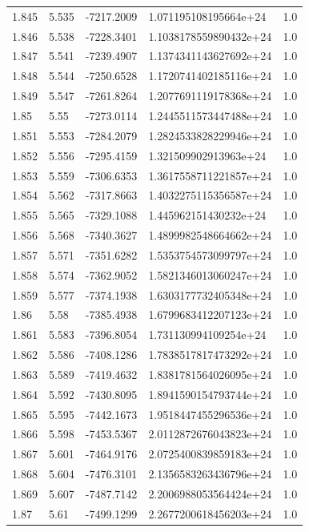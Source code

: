 \begin{tabular}{lllll}
1.845 & 5.535 & -7217.2009 & 1.071195108195664e+24 & 1.0 \\
1.846 & 5.538 & -7228.3401 & 1.1038178559890432e+24 & 1.0 \\
1.847 & 5.541 & -7239.4907 & 1.1374341143627692e+24 & 1.0 \\
1.848 & 5.544 & -7250.6528 & 1.1720741402185116e+24 & 1.0 \\
1.849 & 5.547 & -7261.8264 & 1.2077691119178368e+24 & 1.0 \\
1.85 & 5.55 & -7273.0114 & 1.2445511573447488e+24 & 1.0 \\
1.851 & 5.553 & -7284.2079 & 1.2824533828229946e+24 & 1.0 \\
1.852 & 5.556 & -7295.4159 & 1.321509902913963e+24 & 1.0 \\
1.853 & 5.559 & -7306.6353 & 1.3617558711221857e+24 & 1.0 \\
1.854 & 5.562 & -7317.8663 & 1.4032275115356587e+24 & 1.0 \\
1.855 & 5.565 & -7329.1088 & 1.445962151430232e+24 & 1.0 \\
1.856 & 5.568 & -7340.3627 & 1.4899982548664662e+24 & 1.0 \\
1.857 & 5.571 & -7351.6282 & 1.5353754573099797e+24 & 1.0 \\
1.858 & 5.574 & -7362.9052 & 1.5821346013060247e+24 & 1.0 \\
1.859 & 5.577 & -7374.1938 & 1.6303177732405348e+24 & 1.0 \\
1.86 & 5.58 & -7385.4938 & 1.6799683412207123e+24 & 1.0 \\
1.861 & 5.583 & -7396.8054 & 1.731130994109254e+24 & 1.0 \\
1.862 & 5.586 & -7408.1286 & 1.7838517817473292e+24 & 1.0 \\
1.863 & 5.589 & -7419.4632 & 1.8381781564026095e+24 & 1.0 \\
1.864 & 5.592 & -7430.8095 & 1.8941590154793744e+24 & 1.0 \\
1.865 & 5.595 & -7442.1673 & 1.9518447455296536e+24 & 1.0 \\
1.866 & 5.598 & -7453.5367 & 2.0112872676043823e+24 & 1.0 \\
1.867 & 5.601 & -7464.9176 & 2.0725400839859183e+24 & 1.0 \\
1.868 & 5.604 & -7476.3101 & 2.1356583263436796e+24 & 1.0 \\
1.869 & 5.607 & -7487.7142 & 2.2006988053564424e+24 & 1.0 \\
1.87 & 5.61 & -7499.1299 & 2.2677200618456203e+24 & 1.0 \\

\end{tabular}
